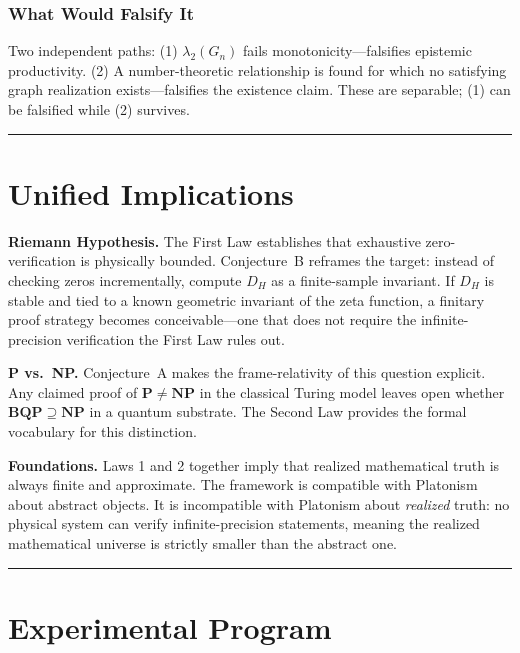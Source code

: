 \documentclass[12pt]{article}
\theoremstyle{lawstyle}
\theoremstyle{conjstyle}
\theoremstyle{predstyle}
\begin{document}
\subsubsection*{What Would Falsify It}

Two independent paths: (1) $\lambda_2(G_n)$ fails monotonicity---falsifies epistemic
productivity. (2) A number-theoretic relationship is found for which no satisfying graph
realization exists---falsifies the existence claim. These are separable; (1) can be
falsified while (2) survives.

\bigskip
\hrule
\bigskip

\section{Unified Implications}

\textbf{Riemann Hypothesis.} The First Law establishes that exhaustive zero-verification is
physically bounded. Conjecture~B reframes the target: instead of checking zeros
incrementally, compute $D_H$ as a finite-sample invariant. If $D_H$ is stable and tied to a
known geometric invariant of the zeta function, a finitary proof strategy becomes
conceivable---one that does not require the infinite-precision verification the First Law
rules out.

\textbf{P vs.\ NP.} Conjecture~A makes the frame-relativity of this question explicit. Any
claimed proof of $\mathbf{P} \neq \mathbf{NP}$ in the classical Turing model leaves open
whether $\mathbf{BQP} \supseteq \mathbf{NP}$ in a quantum substrate. The Second Law
provides the formal vocabulary for this distinction.

\textbf{Foundations.} Laws 1 and 2 together imply that realized mathematical truth is always
finite and approximate. The framework is compatible with Platonism about abstract objects. It
is incompatible with Platonism about \emph{realized} truth: no physical system can verify
infinite-precision statements, meaning the realized mathematical universe is strictly smaller
than the abstract one.

\bigskip
\hrule
\bigskip

\section{Experimental Program}
\end{document}
